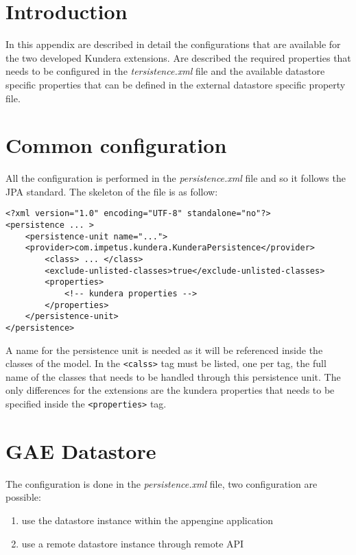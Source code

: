 \section{Introduction}
In this appendix are described in detail the configurations that are available for the two developed Kundera extensions.
Are described the required properties that needs to be configured in the \textit{tersistence.xml} file and the available datastore specific properties that can be defined in the external datastore specific property file.

\section{Common configuration}
All the configuration is performed in the \textit{persistence.xml} file and so it follows the JPA standard.
The skeleton of the file is as follow:

\begin{verbatim}
<?xml version="1.0" encoding="UTF-8" standalone="no"?>
<persistence ... >
    <persistence-unit name="...">
    <provider>com.impetus.kundera.KunderaPersistence</provider>
        <class> ... </class>
        <exclude-unlisted-classes>true</exclude-unlisted-classes>
        <properties>
            <!-- kundera properties -->
        </properties>
    </persistence-unit>
</persistence>
\end{verbatim}

\noindent A name for the persistence unit is needed as it will be referenced inside the classes of the model.
In the \texttt{<calss>} tag must be listed, one per tag, the full name of the classes that needs to be handled through this persistence unit.
The only differences for the extensions are the kundera properties that needs to be specified inside the \texttt{<properties>} tag.

\section{GAE Datastore}
\label{appendix:datastore-config}
The configuration is done in the \textit{persistence.xml} file, two configuration are possible:
\begin{enumerate}
\item use the datastore instance within the appengine application
\item use a remote datastore instance through remote API
\end{enumerate}

